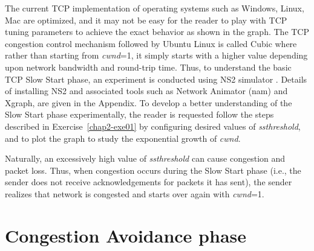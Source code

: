 \begin{multicols}{2}
The current TCP implementation of operating systems such as Windows, Linux, Mac are optimized, and it may not be easy for the reader to play with TCP tuning parameters to achieve the exact behavior as shown in the graph. The TCP congestion control mechanism followed by Ubuntu Linux is called Cubic \cite{art2-key08} where rather than starting from \textit{cwnd}=1, it simply starts with a higher value depending upon network bandwidth and round-trip time. Thus, to understand the basic TCP Slow Start phase, an experiment is conducted using NS2 simulator \cite{art2-key09}. Details of installing NS2 and associated tools such as Network Animator (nam) \cite{art2-key10} and Xgraph\cite{art2-key11}, are given in the Appendix. To develop a better understanding of the Slow Start phase experimentally, the reader is requested follow the steps described in Exercise~\ref{chap2-exe01} by configuring desired values of \textit{ssthreshold}, and to plot the graph to study the exponential growth of \textit{cwnd}.

Naturally, an excessively high value of \textit{ssthreshold} can cause congestion and packet loss. Thus, when congestion occurs during the Slow Start phase (i.e., the sender does not receive acknowledgements for packets it has sent), the sender realizes that network is congested and starts over again with \textit{cwnd}=1.

\section{Congestion Avoidance phase}


\end{multicols}
